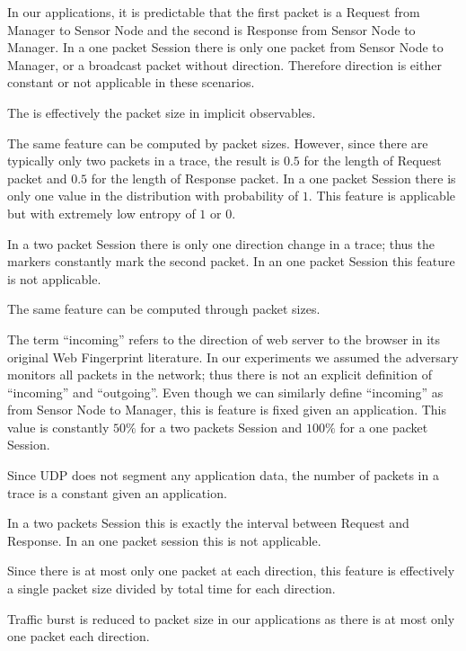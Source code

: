 \begin{description}[style=nextline]
	\item[Direction]
	In our applications, it is predictable that the first packet is a Request from Manager to Sensor Node and the second is Response from Sensor Node to Manager. In a one packet Session there is only one packet from Sensor Node to Manager, or a broadcast packet without direction. Therefore direction is either constant or not applicable in these scenarios.
	
	\item[Length]
	The is effectively the packet size in implicit observables.
	
	\item[Frequency Distribution of Length]
	The same feature can be computed by packet sizes. However, since there are typically only two packets in a trace, the result is $0.5$ for the length of Request packet and $0.5$ for the length of Response packet. In a one packet Session there is only one value in the distribution with probability of $1$. This feature is applicable but with extremely low entropy of $1$ or $0$.
	
	\item[Size, HTML and Number Markers]
	In a two packet Session there is only one direction change in a trace; thus the markers constantly mark the second packet. In an one packet Session this feature is not applicable.
	
	\item[Total Bytes]
	The same feature can be computed through packet sizes.
	
	\item[Percentage Incoming Packets]
	The term ``incoming'' refers to the direction of web server to the browser in its original Web Fingerprint literature. In our experiments we assumed the adversary monitors all packets in the network; thus there is not an explicit definition of ``incoming'' and ``outgoing''. Even though we can similarly define ``incoming'' as from Sensor Node to Manager, this is feature is fixed given an application. This value is constantly $50\%$ for a two packets Session and $100\%$ for a one packet Session.
	
	\item[Number of Packets]
	Since UDP does not segment any application data, the number of packets in a trace is a constant given an application. 
	
	\item[Total Time]
	In a two packets Session this is exactly the interval between Request and Response. In an one packet session this is not applicable.
	
	\item[Total Per-direction Bandwidth]
	Since there is at most only one packet at each direction, this feature is effectively a single packet size divided by total time for each direction.
	
	\item[Traffic Burst]
	Traffic burst is reduced to packet size in our applications as there is at most only one packet each direction.
\end{description}

